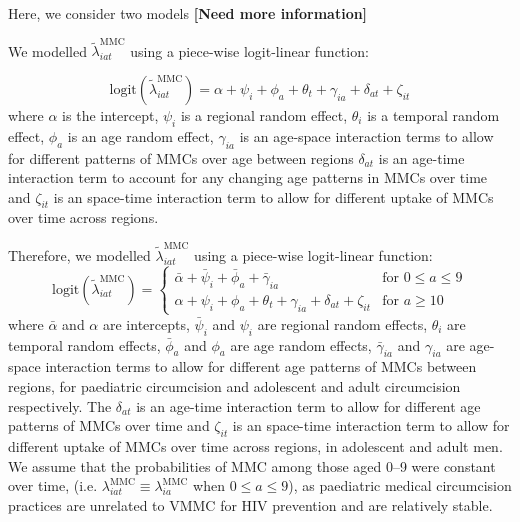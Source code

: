 \documentclass{article}
\begin{document}
\begin{appendix}
Here, we consider two models {\color{red}\bf[Need more information]} 

We modelled $\tilde{\lambda}^{\text{MMC}}_{iat}$ using a piece-wise logit-linear function:

\begin{equation*}
	\text{logit}(\tilde{\lambda}^{\text{MMC}}_{iat}) = \alpha + \psi_i + \phi_a + \theta_t + \gamma_{ia} + \delta_{at} + \zeta_{it} 
\end{equation*}
where $\alpha$ is the intercept, $\psi_i$ is a regional random effect, $\theta_i$ is a temporal random effect, $\phi_a$ is an age random effect, $\gamma_{ia}$ is an age-space interaction terms to allow for different patterns of MMCs over age between regions $\delta_{at}$ is an age-time interaction term to account for any changing age patterns in MMCs over time and $\zeta_{it}$ is an space-time interaction term to allow for different uptake of MMCs over time across regions. 


Therefore, we modelled $\tilde{\lambda}^{\text{MMC}}_{iat}$ using a piece-wise logit-linear function:
\begin{equation*}
	\text{logit}(\tilde{\lambda}^{\text{MMC}}_{iat}) =
	\begin{cases}
		\bar{\alpha} + \bar{\psi}_i + \bar{\phi}_a + \bar{\gamma}_{ia} & \text{for } 0 \leq a \leq 9\\
		\alpha + \psi_i + \phi_a + \theta_t + \gamma_{ia} + \delta_{at} + \zeta_{it} & \text{for } a \geq 10
	\end{cases} 
\end{equation*}
where $\bar{\alpha}$ and $\alpha$ are intercepts, $\bar{\psi}_i$ and $\psi_i$ are regional random effects, $\theta_i$ are temporal random effects, $\bar{\phi}_a$ and $\phi_a$ are age random effects, $\bar{\gamma}_{ia}$ and $\gamma_{ia}$ are age-space interaction terms to allow for different age patterns of MMCs between regions, for paediatric circumcision and adolescent and adult circumcision respectively. The $\delta_{at}$ is an age-time interaction term to allow for different age patterns of MMCs over time and $\zeta_{it}$ is an space-time interaction term to allow for different uptake of MMCs over time across regions, in adolescent and adult men. We assume that the probabilities of MMC among those aged 0--9 were constant over time, (i.e. $\lambda^{\text{MMC}}_{iat} \equiv \lambda^{\text{MMC}}_{ia}$ when $0\leq a \leq 9$), as paediatric medical circumcision practices are unrelated to VMMC for HIV prevention and are relatively stable. 


\end{appendix}
\end{document}

